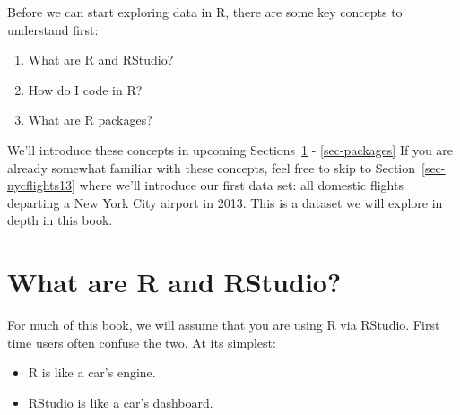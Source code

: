 \documentclass[
  letterpaper,
  DIV=11,
  numbers=noendperiod]{scrreprt}
\providecommand{\tightlist}{%
  \setlength{\itemsep}{0pt}\setlength{\parskip}{0pt}}\usepackage{longtable,booktabs,array}
\theoremstyle{definition}
\theoremstyle{remark}
\begin{document}
Before we can start exploring data in R, there are some key concepts to
understand first:

\begin{enumerate}
\def\labelenumi{\arabic{enumi}.}
\tightlist
\item
  What are R and RStudio?
\item
  How do I code in R?
\item
  What are R packages?
\end{enumerate}

We'll introduce these concepts in upcoming Sections~\ref{sec-r-rstudio}
- \ref{sec-packages} If you are already somewhat familiar with these
concepts, feel free to skip to Section~\ref{sec-nycflights13} where
we'll introduce our first data set: all domestic flights departing a New
York City airport in 2013. This is a dataset we will explore in depth in
this book.

\hypertarget{sec-r-rstudio}{%
\section{What are R and RStudio?}\label{sec-r-rstudio}}

For much of this book, we will assume that you are using R via RStudio.
First time users often confuse the two. At its simplest:

\begin{itemize}
\tightlist
\item
  R is like a car's engine.
\item
  RStudio is like a car's dashboard.
\end{itemize}
\end{document}

